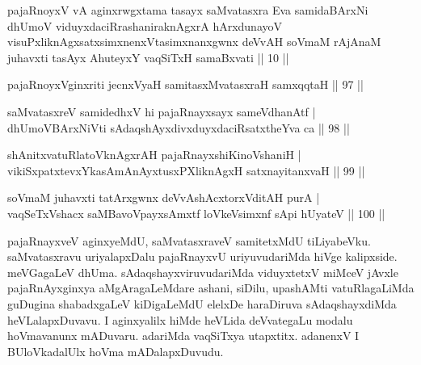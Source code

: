 

\begin{shl}
pajaRnoyxV vA aginxrwgxtama tasayx saMvatasxra Eva samidaBArxNi dhUmoV viduyxdaciRrashaniraknAgxrA hArxdunayoV visuPxliknAgxsatxsimxnenxVtasimxnanxgwnx deVvAH soVmaM rAjAnaM juhavxti tasAyx AhuteyxY vaqSiTxH samaBxvati || 10 ||
\end{shl}

\begin{shl}
pajaRnoyxV\s ginxriti jecnxVyaH samitasxMvatasxraH samxqqtaH \hfill|| 97 || 
\end{shl}

\begin{shl}
saMvatasxreV samidedhxV hi pajaRnayxsayx sameVdhanAtf | \\
dhUmoV\s BArxNiVti sAdaqshAyxdivxduyxdaciRsatxtheYva ca \hfill|| 98 || 
\end{shl}

\begin{shl}
shAnitxvatuRlatoV\s knAgxrAH pajaRnayxshiKinoV\s shaniH | \\
vikiSxpatxtevxYkasAmAnAyxtusxPXliknAgxH satxnayitanxvaH \hfill|| 99 || 
\end{shl}

\begin{shl}
soVmaM juhavxti tatArxgwnx deVvAshAcxtorxVditAH purA | \\
vaqSeTxVshacx saMBavoV\s payxsAmxtf loVkeV\s simxnf sApi hUyateV \hfill|| 100 || 
\end{shl}

\begin{artha}
pajaRnayxveV aginxyeMdU, saMvatasxraveV samitetxMdU tiLiyabeVku. 
\-saMvatasxravu uriyalapxDalu pajaRnayxvU uriyuvudariMda hiVge 
kalipxside. meVGagaLeV dhUma. sAdaqshayxviruvudariMda viduyxtetxV 
miMceV jAvxle pajaRnAyxginxya aMgAragaLeMdare ashani, siDilu, 
upashAMti vatuRlagaLiMda guDugina shabadxgaLeV kiDigaLeMdU elelxDe 
haraDiruva sAdaqshayxdiMda heVLalapxDuvavu. I aginxyalilx hiMde 
heVLida deVvategaLu modalu hoVmavanunx mADuvaru. adariMda vaqSiTxya 
utapxtitx. adanenxV I BUloVkadalUlx hoVma mADalapxDuvudu.
\end{artha}
